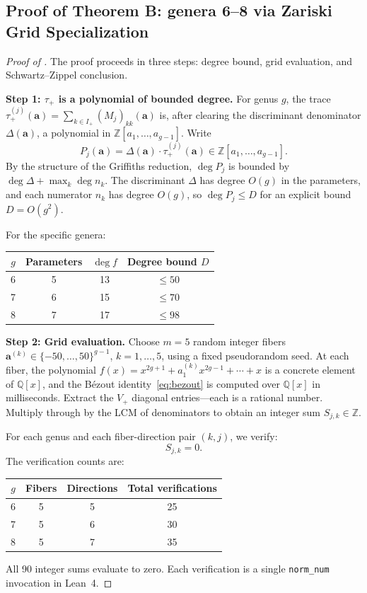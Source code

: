 \documentclass[11pt]{article}
\theoremstyle{plain}
\theoremstyle{definition}
\theoremstyle{remark}
\newcommand{\ZZ}{\mathbb{Z}}
\newcommand{\QQ}{\mathbb{Q}}
\begin{document}
\subsection{Proof of Theorem B: genera 6--8 via Zariski Grid Specialization}
\label{sec:proof-B}

\begin{proof}[Proof of ]
The proof proceeds in three steps: degree bound, grid evaluation,
and Schwartz--Zippel conclusion.

\medskip\noindent\textbf{Step 1: $\tau_+$ is a polynomial of bounded degree.}
For genus $g$, the trace
$\tau_+^{(j)}(\mathbf{a}) = \sum_{k \in I_+} (M_j)_{kk}(\mathbf{a})$
is, after clearing the discriminant denominator $\Delta(\mathbf{a})$,
a polynomial in $\ZZ[a_1, \ldots, a_{g-1}]$.  Write
\[
  P_j(\mathbf{a}) = \Delta(\mathbf{a}) \cdot \tau_+^{(j)}(\mathbf{a})
    \in \ZZ[a_1, \ldots, a_{g-1}].
\]
By the structure of the Griffiths reduction, $\deg P_j$ is bounded by
$\deg \Delta + \max_k \deg n_k$.  The discriminant $\Delta$ has degree
$O(g)$ in the parameters, and each numerator $n_k$ has degree $O(g)$, so
$\deg P_j \leq D$ for an explicit bound $D = O(g^2)$.

For the specific genera:
\begin{center}
\begin{tabular}{cccc}
\toprule
$g$ & Parameters & $\deg f$ & Degree bound $D$ \\
\midrule
6 & 5 & 13 & $\leq 50$ \\
7 & 6 & 15 & $\leq 70$ \\
8 & 7 & 17 & $\leq 98$ \\
\bottomrule
\end{tabular}
\end{center}

\medskip\noindent\textbf{Step 2: Grid evaluation.}
Choose $m = 5$ random integer fibers
$\mathbf{a}^{(k)} \in \{-50, \ldots, 50\}^{g-1}$, $k = 1, \ldots, 5$,
using a fixed pseudorandom seed.  At each fiber, the polynomial
$f(x) = x^{2g+1} + a_1^{(k)} x^{2g-1} + \cdots + x$ is a concrete element
of $\QQ[x]$, and the B\'ezout identity~\eqref{eq:bezout} is computed over
$\QQ[x]$ in milliseconds.  Extract the $V_+$ diagonal entries---each is
a rational number.  Multiply through by the LCM of denominators to obtain
an integer sum $S_{j,k} \in \ZZ$.

For each genus and each fiber-direction pair $(k, j)$, we verify:
\[
  S_{j,k} = 0.
\]
The verification counts are:
\begin{center}
\begin{tabular}{cccc}
\toprule
$g$ & Fibers & Directions & Total verifications \\
\midrule
6 & 5 & 5 & 25 \\
7 & 5 & 6 & 30 \\
8 & 5 & 7 & 35 \\
\bottomrule
\end{tabular}
\end{center}
All 90 integer sums evaluate to zero.  Each verification is a single
\texttt{norm\_num} invocation in Lean~4.


\end{proof}
\end{document}

